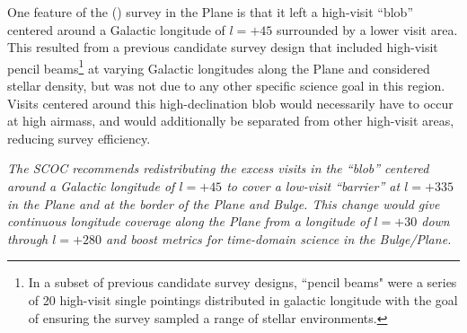 One feature of the  () survey in the Plane is that it left a high-visit ``blob'' centered around a Galactic longitude of $l=+45$ surrounded by a lower visit area. This resulted from a previous candidate survey design that included high-visit pencil beams\footnote{In a subset of previous candidate survey designs, ``pencil beams" were a series of 20 high-visit single pointings distributed in galactic longitude with the goal of ensuring the survey sampled a range of stellar environments.} at varying Galactic longitudes along the Plane and considered stellar density, but was not due to any other specific science goal in this region. Visits centered around this high-declination blob would necessarily have to occur at high airmass, and would additionally be separated from other high-visit areas, reducing survey efficiency.

{\it The SCOC recommends redistributing the excess visits in the ``blob'' centered around a Galactic longitude of $l=+45$ to cover a low-visit ``barrier'' at $l=+335$ in the Plane and at the border of the Plane and Bulge. This change would give continuous longitude coverage along the Plane from a longitude of $l=+30$ down through $l=+280$ and boost metrics for time-domain science in the Bulge/Plane.}


